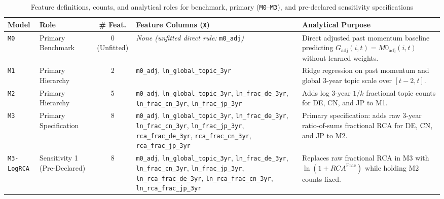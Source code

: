 \begin{table}[htbp]
\centering
\caption{Feature definitions, counts, and analytical roles for benchmark, primary (\texttt{M0}--\texttt{M3}), and pre-declared sensitivity specifications}
\label{tab:model-features}
\footnotesize
\setlength{\tabcolsep}{3.5pt}
\begin{tabular}{>{\raggedright\arraybackslash}p{1.75cm} >{\raggedright\arraybackslash}p{2.05cm} c >{\raggedright\arraybackslash}p{4.75cm} >{\raggedright\arraybackslash}p{3.65cm}}
\toprule
\textbf{Model} & \textbf{Role} & \textbf{\# Feat.} & \textbf{Feature Columns (\texttt{X})} & \textbf{Analytical Purpose} \\
\midrule
\texttt{M0} & Primary Benchmark & 0 (Unfitted) & \textit{None (unfitted direct rule: } \texttt{m0\_adj}\textit{)} & Direct adjusted past momentum baseline predicting $G_{\text{adj}}(i,t) = M0_{\text{adj}}(i,t)$ without learned weights. \\
\addlinespace[3pt]
\texttt{M1} & Primary Hierarchy & 2 & \texttt{m0\_adj}, \texttt{ln\_global\_topic\_3yr} & Ridge regression on past momentum and global 3-year topic scale over $[t-2, t]$. \\
\texttt{M2} & Primary Hierarchy & 5 & \texttt{m0\_adj}, \texttt{ln\_global\_topic\_3yr}, \texttt{ln\_frac\_de\_3yr}, \texttt{ln\_frac\_cn\_3yr}, \texttt{ln\_frac\_jp\_3yr} & Adds log 3-year $1/k$ fractional topic counts for DE, CN, and JP to M1. \\
\texttt{M3} & Primary Specification & 8 & \texttt{m0\_adj}, \texttt{ln\_global\_topic\_3yr}, \texttt{ln\_frac\_de\_3yr}, \texttt{ln\_frac\_cn\_3yr}, \texttt{ln\_frac\_jp\_3yr}, \texttt{rca\_frac\_de\_3yr}, \texttt{rca\_frac\_cn\_3yr}, \texttt{rca\_frac\_jp\_3yr} & Primary specification: adds raw 3-year ratio-of-sums fractional RCA for DE, CN, and JP to M2. \\
\addlinespace[3pt]
\midrule
\texttt{M3-LogRCA} & Sensitivity 1 (Pre-Declared) & 8 & \texttt{m0\_adj}, \texttt{ln\_global\_topic\_3yr}, \texttt{ln\_frac\_de\_3yr}, \texttt{ln\_frac\_cn\_3yr}, \texttt{ln\_frac\_jp\_3yr}, \texttt{ln\_rca\_frac\_de\_3yr}, \texttt{ln\_rca\_frac\_cn\_3yr}, \texttt{ln\_rca\_frac\_jp\_3yr} & Replaces raw fractional RCA in M3 with $\ln(1 + RCA^{\text{Frac}})$ while holding M2 counts fixed. \\

\end{tabular}
\end{table}
